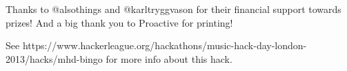 \vspace{0.25cm}
\noindent
Thanks to @alsothings and @karltryggvason for their financial support towards prizes! And a big thank you to Proactive for printing!
\vspace{0.25cm}

\noindent
See https://www.hackerleague.org/hackathons/music-hack-day-london-2013/hacks/mhd-bingo for more info about this hack.
\newpage